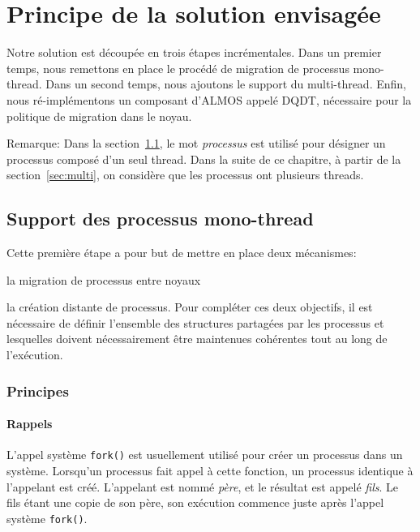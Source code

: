 \chapter{Principe de la solution envisagée}
\label{chap:sol}

  Notre solution est découpée en trois étapes incrémentales. Dans un premier
  temps, nous remettons en place le procédé de migration de processus
  mono-thread. Dans un second temps, nous ajoutons le support du
  multi-thread. Enfin, nous ré-implémentons un composant d'ALMOS appelé DQDT,
  nécessaire pour la politique de migration dans le noyau.

  \begin{paragraph}{Remarque:}
    Dans la section~\ref{sec:mono}, le mot \textit{processus} est utilisé pour
    désigner un processus composé d'un seul thread. Dans la suite de ce
    chapitre, à partir de la section~\ref{sec:multi}, on considère que les
    processus ont plusieurs threads.
  \end{paragraph}


  \section{Support des processus mono-thread}
  \label{sec:mono}

    Cette première étape a pour but de mettre en place deux mécanismes:
    \benumline \item la migration de processus entre noyaux \item la création
    distante de processus\eenumline. Pour compléter ces deux objectifs, il est
    nécessaire de définir l'ensemble des structures partagées par les processus
    et lesquelles doivent nécessairement être maintenues cohérentes tout au long
    de l'exécution.

    \subsection{Principes}

      \subsubsection{Rappels}

        L'appel système \texttt{fork()} est usuellement utilisé pour créer un
        processus dans un système. Lorsqu'un processus fait appel à cette
        fonction, un processus identique à l'appelant est créé. L'appelant est
        nommé \textit{père}, et le résultat est appelé \textit{fils}. Le fils
        étant une copie de son père, son exécution commence juste après l'appel
        système \texttt{fork()}.

